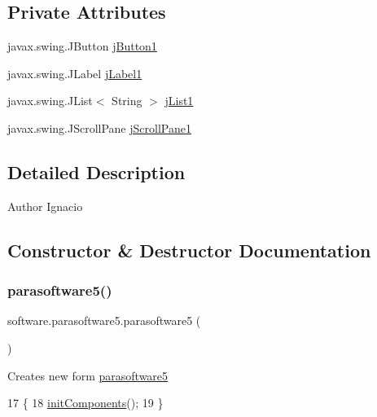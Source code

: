 \subsection*{Private Attributes}
\begin{DoxyCompactItemize}
\item 
javax.\+swing.\+J\+Button \mbox{\hyperlink{classsoftware_1_1parasoftware5_ab414e05e8b6d539af83f7c8f6c77f61f}{j\+Button1}}
\item 
javax.\+swing.\+J\+Label \mbox{\hyperlink{classsoftware_1_1parasoftware5_af4b23e74de14b990bb7d45f82d6f6e99}{j\+Label1}}
\item 
javax.\+swing.\+J\+List$<$ String $>$ \mbox{\hyperlink{classsoftware_1_1parasoftware5_a8aaa4631814597b59a824b075c3add82}{j\+List1}}
\item 
javax.\+swing.\+J\+Scroll\+Pane \mbox{\hyperlink{classsoftware_1_1parasoftware5_a6f96f0532db133badaa13805011edbbf}{j\+Scroll\+Pane1}}
\end{DoxyCompactItemize}


\subsection{Detailed Description}
\begin{DoxyAuthor}{Author}
Ignacio 
\end{DoxyAuthor}


\subsection{Constructor \& Destructor Documentation}
\mbox{\label{classsoftware_1_1parasoftware5_ad0430c2ad5591b3b6e6c095661c4e1e9}} 
\subsubsection{\texorpdfstring{parasoftware5()}{parasoftware5()}}
{\footnotesize\ttfamily software.\+parasoftware5.\+parasoftware5 (\begin{DoxyParamCaption}{ }\end{DoxyParamCaption})\hspace{0.3cm}{\ttfamily [inline]}}

Creates new form \mbox{\hyperlink{classsoftware_1_1parasoftware5}{parasoftware5}} 
\begin{DoxyCode}
17                            \{
18         \mbox{\hyperlink{classsoftware_1_1parasoftware5_a14cb4e4406beda41b9822faeb9decfe9}{initComponents}}();
19     \}
\end{DoxyCode}


